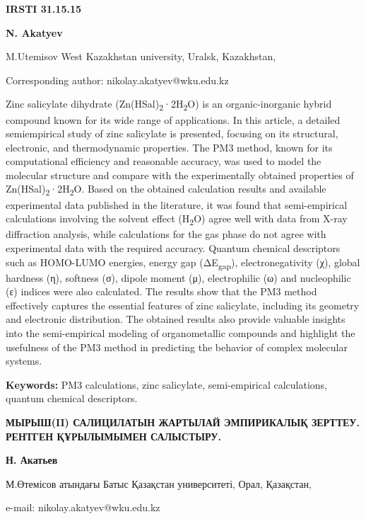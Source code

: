 \newpage
{\bfseries IRSTI 31.15.15}


\begin{center}
{\bfseries N. Akatyev}

M.Utemisov West Kazakhstan university, Uralsk, Kazakhstan,

Corresponding author: nikolay.akatyev@wku.edu.kz
\end{center}

Zinc salicylate dihydrate
(Zn(HSal)\textsubscript{2}·2H\textsubscript{2}O) is an organic-inorganic
hybrid compound known for its wide range of applications. In this
article, a detailed semiempirical study of zinc salicylate is presented,
focusing on its structural, electronic, and thermodynamic properties.
The PM3 method, known for its computational efficiency and reasonable
accuracy, was used to model the molecular structure and compare with the
experimentally obtained properties of
Zn(HSal)\textsubscript{2}·2H\textsubscript{2}O. Based on the obtained
calculation results and available experimental data published in the
literature, it was found that semi-empirical calculations involving the
solvent effect (H\textsubscript{2}O) agree well with data from X-ray
diffraction analysis, while calculations for the gas phase do not agree
with experimental data with the required accuracy. Quantum chemical
descriptors such as HOMO-LUMO energies, energy gap
(ΔE\textsubscript{gap}), electronegativity (χ), global hardness (η),
softness (σ), dipole moment (μ), electrophilic (ω) and nucleophilic (ε)
indices were also calculated. The results show that the PM3 method
effectively captures the essential features of zinc salicylate,
including its geometry and electronic distribution. The obtained results
also provide valuable insights into the semi-empirical modeling of
organometallic compounds and highlight the usefulness of the PM3 method
in predicting the behavior of complex molecular systems.

{\bfseries Keywords:} PM3 calculations, zinc salicylate, semi-empirical
calculations, quantum chemical descriptors.

\begin{center}
{\large\bfseries МЫРЫШ(II) САЛИЦИЛАТЫН ЖАРТЫЛАЙ ЭМПИРИКАЛЫҚ ЗЕРТТЕУ. РЕНТГЕН
ҚҰРЫЛЫМЫМЕН САЛЫСТЫРУ.}

{\bfseries Н. Акатьев}

М.Өтемісов атындағы Батыс Қазақстан университеті, Орал, Қазақстан,

e-mail: nikolay.akatyev@wku.edu.kz
\end{center}

